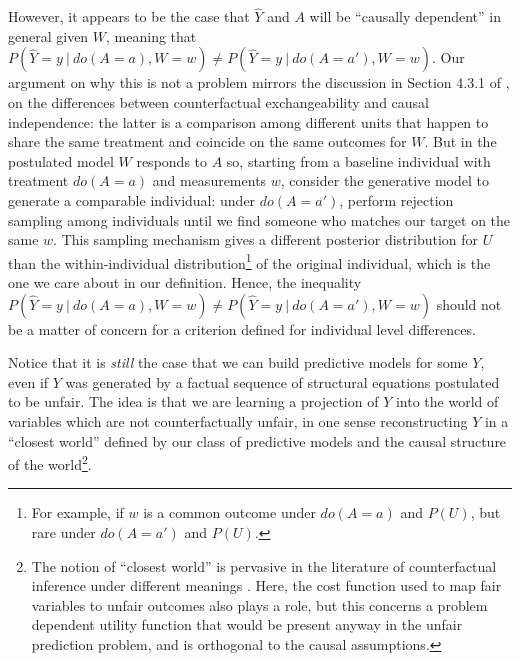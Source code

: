 However, it appears to be the case that $\hat Y$ and $A$ will be
``causally dependent'' in general given $W$, meaning that $P(\hat Y =
y\ |\ do(A = a), W = w) \neq P(\hat Y = y\ |\ do(A = a'), W = w)$.
Our argument on why this is not a problem mirrors the discussion in
Section 4.3.1 of \cite{pearl:16}, on the differences between
counterfactual exchangeability and causal independence: the latter is
a comparison among different units that happen to share the same
treatment and coincide on the same outcomes for $W$. But in the
postulated model $W$ responds to $A$ so, starting from a baseline
individual with treatment $do(A = a)$ and measurements $w$, consider
the generative model to generate a comparable individual: under $do(A
= a')$, perform rejection sampling among individuals until we find
someone who matches our target on the same $w$. This sampling
mechanism gives a different posterior distribution for $U$ than the
within-individual distribution\footnote{For example, if $w$ is a
  common outcome under $do(A = a)$ and $P(U)$, but rare under $do(A =
  a')$ and $P(U)$.} of the original individual, which is the one we care about in our
definition. Hence, the inequality $P(\hat Y = y\ |\ do(A = a), W = w)
\neq P(\hat Y = y\ |\ do(A = a'), W = w)$ should not be a matter of
concern for a criterion defined for individual level differences.

Notice that it is {\it still} the case that we can build predictive
models for some $Y$, even if $Y$ was generated by a factual sequence
of structural equations postulated to be unfair.  The idea is that we
are learning a projection of $Y$ into the world of variables which are
not counterfactually unfair, in one sense reconstructing $Y$ in a
``closest world'' defined by our class of predictive models and the
causal structure of the world\footnote{The notion of ``closest world''
  is pervasive in the literature of counterfactual inference under
  different meanings \citep{pearl:00, halpern:16}.  Here, the cost
  function used to map fair variables to unfair outcomes also plays a
  role, but this concerns a problem dependent utility function that
  would be present anyway in the unfair prediction problem, and is
  orthogonal to the causal assumptions.}.






